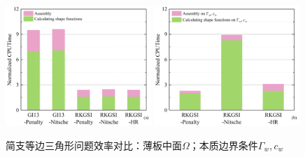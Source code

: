 \begin{figure}[H]
    \centering
    \begin{subcaptiongroup}
    \includegraphics[width=0.49\textwidth]{figure/PHR/T/Cefficiencyomega.png}
    \label{Cefficiencyomega}
    \includegraphics[width=0.49\textwidth]{figure/PHR/T/Cefficiencygamma.png}
    \label{Cefficiencygamma}
    \end{subcaptiongroup}
\caption{简支等边三角形问题效率对比：薄板中面$\Omega$；本质边界条件$\Gamma_w,c_w$}
\label{Tefficiency}
\end{figure}
\newpage
